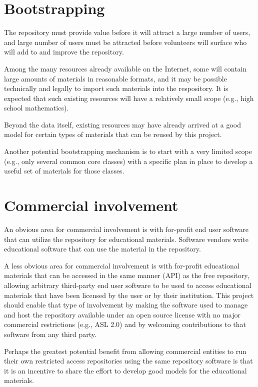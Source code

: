 \section*{Bootstrapping}

The repository must provide value before it will attract a large number
of users, and large number of users must be attracted before volunteers
will surface who will add to and improve the repository.

Among the many resources already available on the Internet, some will
contain large amounts of materials in reasonable formats, and it may be
possible technically and legally to import such materials into the
respository.  It is expected that such existing resources will have a
relatively small scope (e.g., high school mathematics).

Beyond the data itself, existing resources may have already arrived at
a good model for certain types of materials that can be reused by this
project.

Another potential bootstrapping mechanism is to start with a very limited
scope (e.g., only several common core classes) with a specific plan in place
to develop a useful set of materials for those classes.

\section*{Commercial involvement}

An obvious area for commercial involvement is with for-profit end
user software that can utilize the repository for educational
materials.  Software vendors write educational software that can
use the material in the repository.

A less obvious area for commercial involvement is with for-profit
educational materials that can be accessed in the same manner (API)
as the free repository, allowing arbitrary third-party end user software to
be used to access educational materials that have been licensed by the
user or by their institution.  This project should enable that type of 
involvement
by making the software used to manage
and host the repository available under an open source license with no
major commercial restrictions (e.g., ASL 2.0) and by welcoming
contributions to that software from any third party.

Perhaps the greatest potential benefit from allowing commercial entities
to run their own restricted access repositories using the same repository
software is that it is an incentive to share the effort to develop good
models for the educational materials.

